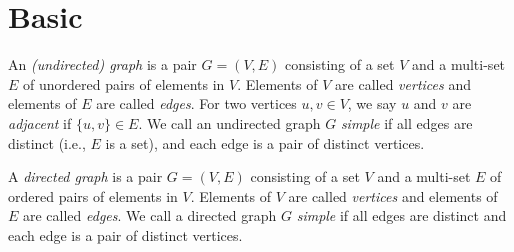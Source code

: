\section{Basic}

\begin{definition}
  An \textit{(undirected) graph} is a pair $G = (V,E)$ consisting of a set $V$ 
  and a multi-set $E$ of unordered pairs of elements in $V$. 
  Elements of $V$ are called \textit{vertices} and elements of $E$ are called \textit{edges}.
  For two vertices $u,v \in V$, we say $u$ and $v$ are \textit{adjacent} if $\{u,v\} \in E$.
  We call an undirected graph $G$ \textit{simple} if all edges are distinct (i.e., $E$ is a set), 
  and each edge is a pair of distinct vertices.
\end{definition}

\begin{definition}
  A \textit{directed graph} is a pair $G = (V,E)$ consisting of a set $V$ 
  and a multi-set $E$ of ordered pairs of elements in $V$. 
  Elements of $V$ are called \textit{vertices} and elements of $E$ are called \textit{edges}.
  We call a directed graph $G$ \textit{simple} if all edges are distinct and
  each edge is a pair of distinct vertices.
\end{definition}
